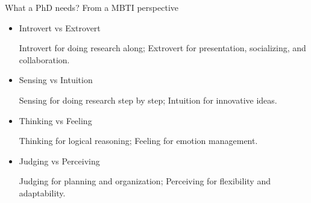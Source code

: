 \documentclass[aspectratio=1610,xcolor=dvipsnames]{beamer}
\begin{document}
\begin{frame}{What a PhD needs? From a MBTI perspective}
    \begin{itemize}
        \item Introvert vs Extrovert
        
        Introvert for doing research along; Extrovert for presentation, socializing, and collaboration.

        \item Sensing vs Intuition
        
        Sensing for doing research step by step; Intuition for innovative ideas.

        \item Thinking vs Feeling
        
        Thinking for logical reasoning; Feeling for emotion management.

        \item Judging vs Perceiving
        
        Judging for planning and organization; Perceiving for flexibility and adaptability.
    \end{itemize}
\end{frame}
\end{document}

